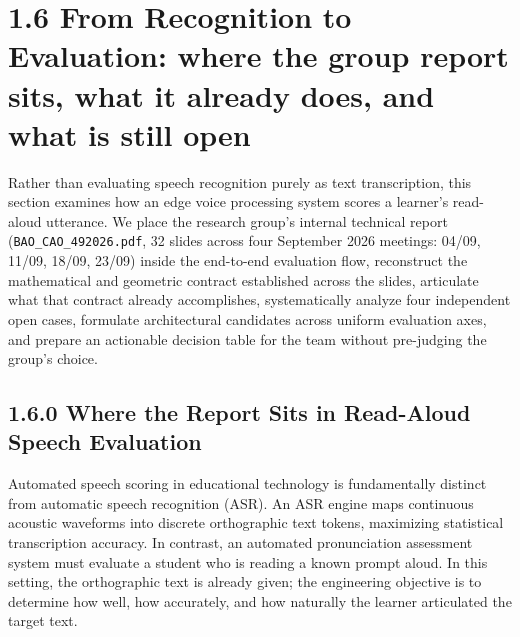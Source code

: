 \documentclass[11pt,a4paper]{article}
\begin{document}
\section*{1.6 From Recognition to Evaluation: where the group report sits, what it already does, and what is still open}

\begin{learningobj}
Rather than evaluating speech recognition purely as text transcription, this section examines how an edge voice processing system scores a learner's read-aloud utterance. We place the research group's internal technical report (\texttt{BAO\_CAO\_492026.pdf}, 32 slides across four September 2026 meetings: 04/09, 11/09, 18/09, 23/09) inside the end-to-end evaluation flow, reconstruct the mathematical and geometric contract established across the slides, articulate what that contract already accomplishes, systematically analyze four independent open cases, formulate architectural candidates across uniform evaluation axes, and prepare an actionable decision table for the team without pre-judging the group's choice.
\end{learningobj}

\subsection*{1.6.0 Where the Report Sits in Read-Aloud Speech Evaluation}

Automated speech scoring in educational technology is fundamentally distinct from automatic speech recognition (ASR). An ASR engine maps continuous acoustic waveforms into discrete orthographic text tokens, maximizing statistical transcription accuracy. In contrast, an automated pronunciation assessment system must evaluate a student who is reading a known prompt aloud. In this setting, the orthographic text is already given; the engineering objective is to determine how well, how accurately, and how naturally the learner articulated the target text.
\end{document}
